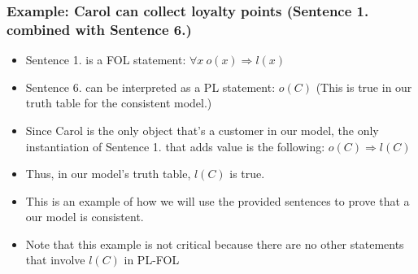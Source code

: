 \documentclass[11pt]{article}
\begin{document}
\subsubsection{Example: Carol can collect loyalty points (Sentence 1. combined with Sentence 6.)}
\label{sec:org01761b3}
\begin{itemize}
\item Sentence 1. is a FOL statement: \(\forall x \: o(x) \Rightarrow l(x)\)
\item Sentence 6. can be interpreted as  a PL statement: \(o(C)\) (This is true in our truth table for the consistent model.)
\item Since Carol is the only object that's a customer in our model, the only instantiation of Sentence 1. that adds value is the following: \(o(C) \Rightarrow l(C)\)
\item Thus, in our model's truth table, \(l(C)\) is true.
\item This is an example of how we will use the provided sentences to prove that a our model is consistent.
\item Note that this example is not critical because there are no other statements that involve \(l(C)\) in PL-FOL
\end{itemize}
\end{document}
